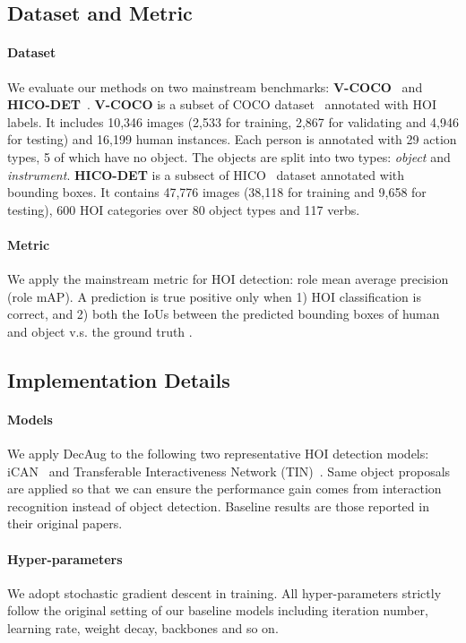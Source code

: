 \documentclass[10pt,twocolumn,letterpaper]{article}
\begin{document}
\subsection{Dataset and Metric}
\paragraph{Dataset}
We evaluate our methods on two mainstream benchmarks: \textbf{V-COCO}~\cite{gupta2015visual} and \textbf{HICO-DET}~\cite{chao2018learning}. \textbf{V-COCO} is a subset of COCO dataset~\cite{lin2014microsoft} annotated with HOI labels. It includes 10,346 images (2,533 for training, 2,867 for validating and 4,946 for testing) and 16,199 human instances. Each person is annotated with 29 action types, 5 of which have no object. The objects are split into two types: \textit{object} and \textit{instrument}. \textbf{HICO-DET} is a subsect of HICO~\cite{chao2015hico} dataset annotated with bounding boxes. It contains 47,776 images (38,118 for training and 9,658 for testing), 600 HOI categories over 80 object types and 117 verbs.

\paragraph{Metric}
We apply the mainstream metric for HOI detection: role mean average precision (role mAP).
A prediction is true positive only when
1) HOI classification is correct, and
2) both the IoUs between the predicted bounding boxes of human and object v.s. the ground truth .


\subsection{Implementation Details}
\paragraph{Models}


We apply DecAug to the following two representative HOI detection models: iCAN~\cite{gao2018ican} and Transferable Interactiveness Network (TIN)~\cite{li2019transferable}.
 Same object proposals are applied so that we can ensure the performance gain comes from interaction recognition instead of object detection.
 Baseline results are those reported in their original papers.

\paragraph{Hyper-parameters}
We adopt stochastic gradient descent in training. All hyper-parameters strictly follow the original setting of our baseline models including iteration number, learning rate, weight decay, backbones and so on.
\end{document}
